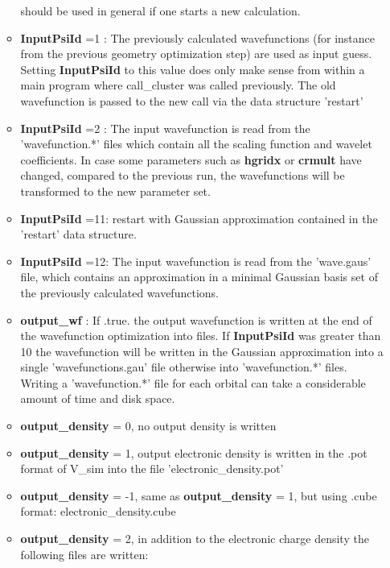 \documentclass[a4paper,11pt]{report}
\begin{document}
\begin{itemize}
\begin{itemize}
                                    should be used in general if one starts a new calculation. 
       \item {\bf InputPsiId } =1 : The previously calculated wavefunctions (for instance from the previous 
                                    geometry optimization step) are used as input guess. Setting {\bf InputPsiId } to 
                                    this value does only make sense from within a main program where call\_cluster was 
                                    called previously. The old wavefunction is passed to the new call via the data structure 'restart'
       \item {\bf InputPsiId } =2 : The input wavefunction is read from the 'wavefunction.*' files which contain all the 
                                    scaling function and wavelet coefficients. In case some parameters such as {\bf hgridx} 
                                    or {\bf crmult} have changed, compared to the previous run, the wavefunctions will be 
                                    transformed to the new parameter set.
       \item {\bf InputPsiId } =11: restart with Gaussian approximation contained in the 'restart' data structure.
       \item {\bf InputPsiId } =12: The input wavefunction is read from the 'wave.gaus'  file, which contains an 
                                    approximation in a minimal Gaussian basis set of the previously calculated wavefunctions.
       \item {\bf output\_wf} : If .true. the output wavefunction is written at the end of the wavefunction optimization 
                               into files. If {\bf InputPsiId } was greater than 10 the wavefunction will be written 
                               in the Gaussian approximation into  a single 'wavefunctions.gau' file otherwise into 
                               'wavefunction.*' files. Writing a  'wavefunction.*' file for each orbital can take a considerable 
                               amount of time and disk space. 
       \item {\bf output\_density} = 0, no output density is written
       \item {\bf output\_density} = 1, output electronic density is written in the .pot format of V\_sim into the file 'electronic\_density.pot'
       \item {\bf output\_density} = -1, same as  {\bf output\_density} = 1, but using .cube format: electronic\_density.cube
       \item {\bf output\_density} = 2, in addition to the electronic charge density the following files are written:

\end{itemize}
\end{itemize}
\end{document}
